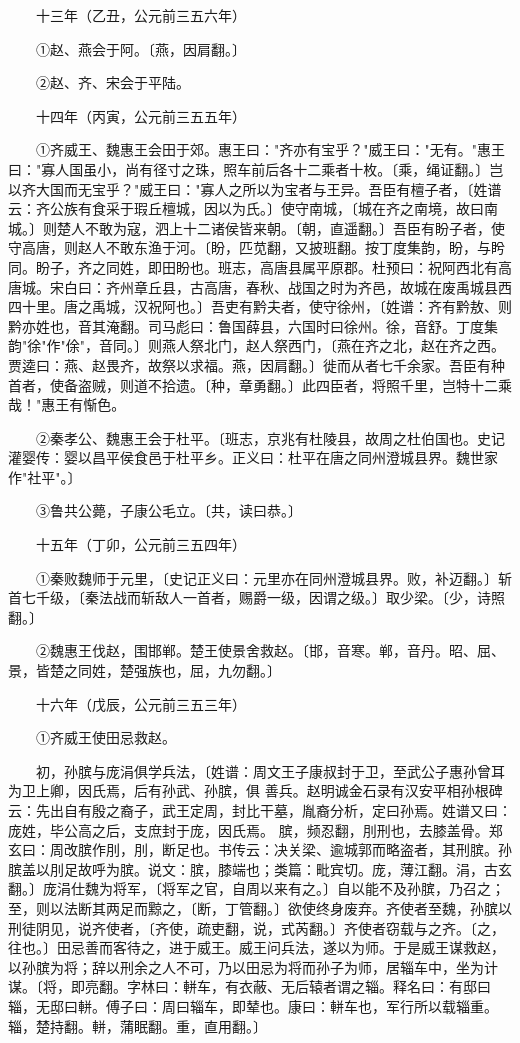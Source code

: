 　　十三年（乙丑，公元前三五六年）

　　①赵、燕会于阿。〔燕，因肩翻。〕

　　②赵、齐、宋会于平陆。

　　十四年（丙寅，公元前三五五年）

　　①齐威王、魏惠王会田于郊。惠王曰："齐亦有宝乎？"威王曰："无有。"惠王曰："寡人国虽小，尚有径寸之珠，照车前后各十二乘者十枚。〔乘，绳证翻。〕岂以齐大国而无宝乎？"威王曰："寡人之所以为宝者与王异。吾臣有檀子者，〔姓谱云：齐公族有食采于瑕丘檀城，因以为氏。〕使守南城，〔城在齐之南境，故曰南城。〕则楚人不敢为寇，泗上十二诸侯皆来朝。〔朝，直遥翻。〕吾臣有盼子者，使守高唐，则赵人不敢东渔于河。〔盼，匹苋翻，又披班翻。按丁度集韵，盼，与盻同。盼子，齐之同姓，即田盼也。班志，高唐县属平原郡。杜预曰：祝阿西北有高唐城。宋白曰：齐州章丘县，古高唐，春秋、战国之时为齐邑，故城在废禹城县西四十里。唐之禹城，汉祝阿也。〕吾吏有黔夫者，使守徐州，〔姓谱：齐有黔敖、则黔亦姓也，音其淹翻。司马彪曰：鲁国薛县，六国时曰徐州。徐，音舒。丁度集韵"徐"作"俆"，音同。〕则燕人祭北门，赵人祭西门，〔燕在齐之北，赵在齐之西。贾逵曰：燕、赵畏齐，故祭以求福。燕，因肩翻。〕徙而从者七千余家。吾臣有种首者，使备盗贼，则道不拾遗。〔种，章勇翻。〕此四臣者，将照千里，岂特十二乘哉！"惠王有惭色。

　　②秦孝公、魏惠王会于杜平。〔班志，京兆有杜陵县，故周之杜伯国也。史记灌婴传：婴以昌平侯食邑于杜平乡。正义曰：杜平在唐之同州澄城县界。魏世家作"社平"。〕

　　③鲁共公薨，子康公毛立。〔共，读曰恭。〕

　　十五年（丁卯，公元前三五四年）

　　①秦败魏师于元里，〔史记正义曰：元里亦在同州澄城县界。败，补迈翻。〕斩首七千级，〔秦法战而斩敌人一首者，赐爵一级，因谓之级。〕取少梁。〔少，诗照翻。〕

　　②魏惠王伐赵，围邯郸。楚王使景舍救赵。〔邯，音寒。郸，音丹。昭、屈、景，皆楚之同姓，楚强族也，屈，九勿翻。〕

　　十六年（戊辰，公元前三五三年）

　　①齐威王使田忌救赵。

　　初，孙膑与庞涓俱学兵法，〔姓谱：周文王子康叔封于卫，至武公子惠孙曾耳为卫上卿，因氏焉，后有孙武、孙膑，俱 善兵。赵明诚金石录有汉安平相孙根碑云：先出自有殷之裔子，武王定周，封比干墓，胤裔分析，定曰孙焉。姓谱又曰：庞姓，毕公高之后，支庶封于庞，因氏焉。 膑，频忍翻，刖刑也，去膝盖骨。郑玄曰：周改膑作刖，刖，断足也。书传云：决关梁、逾城郭而略盗者，其刑膑。孙膑盖以刖足故呼为膑。说文：膑，膝端也；类篇：毗宾切。庞，薄江翻。涓，古玄翻。〕庞涓仕魏为将军，〔将军之官，自周以来有之。〕自以能不及孙膑，乃召之；至，则以法断其两足而黥之，〔断，丁管翻。〕欲使终身废弃。齐使者至魏，孙膑以刑徒阴见，说齐使者，〔齐使，疏吏翻，说，式芮翻。〕齐使者窃载与之齐。〔之，往也。〕田忌善而客待之，进于威王。威王问兵法，遂以为师。于是威王谋救赵，以孙膑为将；辞以刑余之人不可，乃以田忌为将而孙子为师，居辎车中，坐为计谋。〔将，即亮翻。字林曰：軿车，有衣蔽、无后辕者谓之辎。释名曰：有邸曰辎，无邸曰軿。傅子曰：周曰辎车，即辇也。康曰：軿车也，军行所以载辎重。辎，楚持翻。軿，蒲眠翻。重，直用翻。〕

